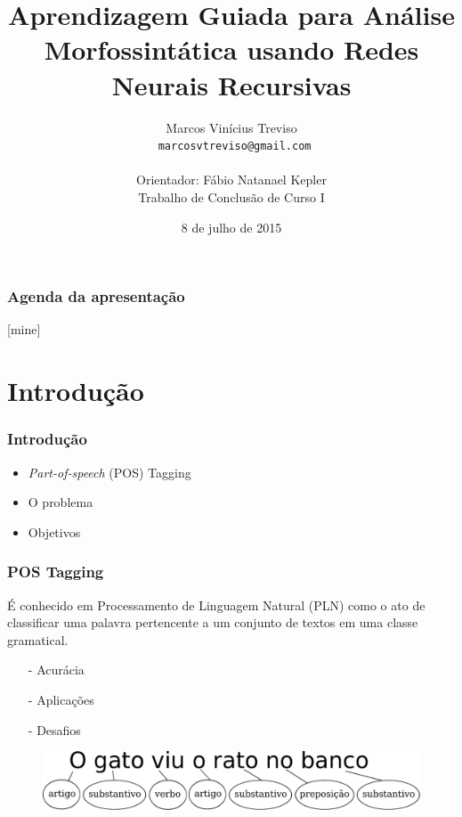 \documentclass[10pt]{beamer}
\title{Aprendizagem Guiada para Análise Morfossintática usando Redes Neurais Recursivas}
\subtitle{}
\date{8 de julho de 2015}
\author[Treviso]{Marcos Vinícius Treviso\\\scriptsize\texttt{ marcosvtreviso@gmail.com}\\\\Orientador: Fábio Natanael Kepler\\\tiny{Trabalho de Conclusão de Curso I}\\}
\institute{Universidade Federal do Pampa}
\begin{document}
\maketitle

\begin{frame}
  \frametitle{Agenda da apresentação}
  [mine]
  \tableofcontents[hideallsubsections]
\end{frame}


\section{Introdução}


\begin{frame}[fragile]
  \frametitle{Introdução}

  \begin{itemize}
      \item \textit{Part-of-speech} (POS) Tagging 
      \item O problema
      \item Objetivos
    \end{itemize}


\end{frame}


\begin{frame}[fragile]
  \frametitle{POS Tagging}

  É conhecido em Processamento de Linguagem Natural (PLN) como o ato de classificar uma palavra pertencente a um conjunto de textos em uma classe gramatical.

 \begin{itemize}
      \item[-] Acurácia
      \item[-] Aplicações
      \item[-] Desafios
    \end{itemize}

  
    \begin{figure}[htb]
    \begin{center}
        \includegraphics[scale=0.5]{img/exemploclassificacao.pdf}
    \end{center}
  \end{figure}

\end{frame}
\end{document}
